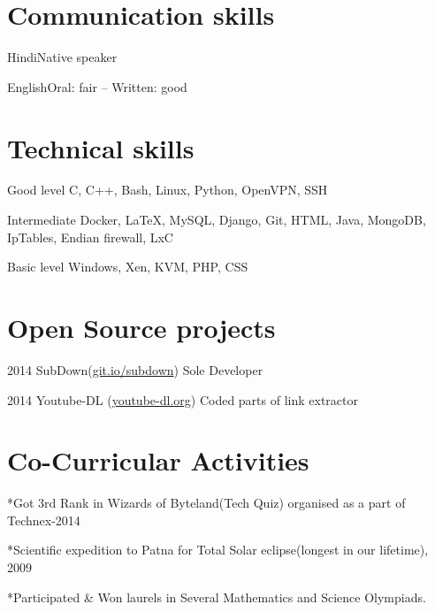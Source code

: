 \documentclass{tccv}
\begin{document}
\section{Communication skills}

\begin{factlist}
\item{Hindi}{Native speaker}
\item{English}{Oral: fair -- Written: good}
\end{factlist}

\section{Technical skills}

\begin{factlist}

\item{Good level}
     {C, C++,  Bash, Linux, Python, OpenVPN, SSH}

\item{Intermediate}
     {Docker, \LaTeX, MySQL, Django,  Git, HTML, Java, MongoDB, IpTables, Endian firewall, LxC}

\item{Basic level}
     {Windows, Xen, KVM, PHP, CSS }

\end{factlist}
\section{Open Source projects}

\begin{yearlist}

\item{2014}
     {SubDown(\href{http://git.io/subdown}{git.io/subdown})}
     {Sole Developer}

\item{2014}
     {Youtube-DL (\href{http://youtube-dl.org/}{youtube-dl.org})}
     {Coded parts of link extractor}


\end{yearlist}

\section{Co-Curricular Activities}

\begin{factlist}
\item{*}{Got 3rd Rank in Wizards of Byteland(Tech Quiz) organised as a part of Technex-2014}
\item{*}{Scientific expedition to Patna for Total Solar eclipse(longest in our lifetime), 2009}
\item{*}{Participated \& Won laurels in Several Mathematics and Science Olympiads.}
\end{factlist}
\end{document}
